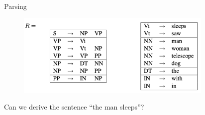 \documentclass[usenames,dvipsnames,notes]{beamer}
\begin{document}
\begin{frame}
    {Parsing}
    \begin{figure}    
        \includegraphics[height=4cm]{figures/toy-cfg-2.png}
    \end{figure}  
    \vspace{-2em}
    Can we derive the sentence ``the man sleeps''?
    \vspace{9em}
\end{frame}
\end{document}
